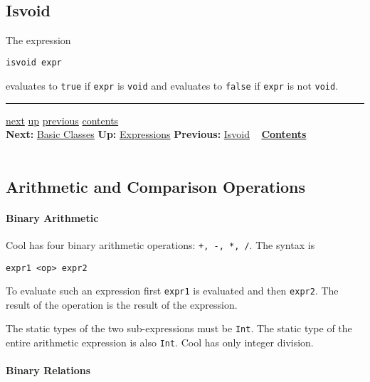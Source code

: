\documentclass[]{article}
\begin{document}
\subsection{\\ Isvoid}

The expression

\begin{verbatim}
isvoid expr
\end{verbatim}

evaluates to \texttt{true} if \texttt{expr} is \texttt{void} and
evaluates to \texttt{false} if \texttt{expr} is not \texttt{void}.

\begin{center}\rule{3in}{0.4pt}\end{center}

\href{node26.html}{next} \href{node13.html}{up}
\href{node24.html}{previous} \href{node1.html}{contents} \\
\textbf{Next:} \href{node26.html}{Basic Classes} \textbf{Up:}
\href{node13.html}{Expressions} \textbf{Previous:}
\href{node24.html}{Isvoid} ~ \textbf{\href{node1.html}{Contents}} \\ \\

\subsection{Arithmetic and Comparison Operations}

\paragraph{Binary Arithmetic}

Cool has four binary arithmetic operations: \texttt{+, -, *, /}. The
syntax is

\begin{verbatim}
expr1 <op> expr2
\end{verbatim}

To evaluate such an expression first \texttt{expr1} is evaluated and
then \texttt{expr2}. The result of the operation is the result of the
expression.

The static types of the two sub-expressions must be \texttt{Int}. The
static type of the entire arithmetic expression is also \texttt{Int}.
Cool has only integer division.

\paragraph{Binary Relations}
\end{document}
